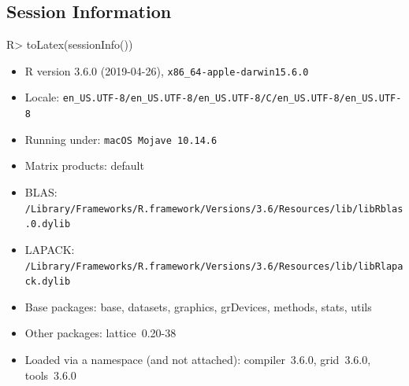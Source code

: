 \documentclass{article}
\begin{document}
\subsection*{Session Information}

\begin{Schunk}
\begin{Sinput}
R> toLatex(sessionInfo())
\end{Sinput}
\begin{itemize}\raggedright
  \item R version 3.6.0 (2019-04-26), \verb|x86_64-apple-darwin15.6.0|
  \item Locale: \verb|en_US.UTF-8/en_US.UTF-8/en_US.UTF-8/C/en_US.UTF-8/en_US.UTF-8|
  \item Running under: \verb|macOS Mojave 10.14.6|
  \item Matrix products: default
  \item BLAS:   \verb|/Library/Frameworks/R.framework/Versions/3.6/Resources/lib/libRblas.0.dylib|
  \item LAPACK: \verb|/Library/Frameworks/R.framework/Versions/3.6/Resources/lib/libRlapack.dylib|
  \item Base packages: base, datasets, graphics, grDevices,
    methods, stats, utils
  \item Other packages: lattice~0.20-38
  \item Loaded via a namespace (and not attached):
    compiler~3.6.0, grid~3.6.0, tools~3.6.0
\end{itemize}\end{Schunk}
\end{document}
